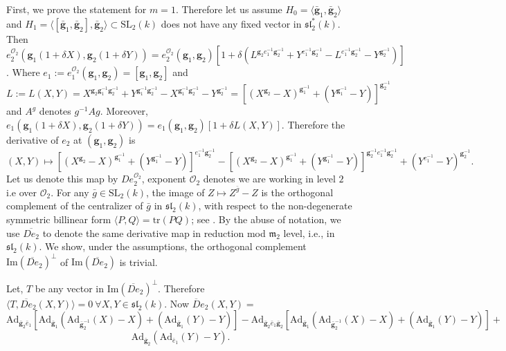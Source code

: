 \documentclass[10pt,twoside]{amsart}
\newcommand{\SL}{\mathrm{SL}}
\newcommand{\tr}{\mathrm{tr}}
\newcommand{\im}{\mathrm{Im}}
\newcommand{\R}{\mathcal{O}_2}
\theoremstyle{definition}
\theoremstyle{definition}
\begin{document}
\iffalse 
First, we prove the statement for $m=1$. 
Therefore let us assume $H_0= \langle \mathbf{\bar g}_1,\mathbf{\bar g}_2\rangle$ and $H_1 = \langle [\mathbf{\bar g}_1, \mathbf{\bar g}_2], \mathbf{\bar g}_2\rangle\subset \SL_2(k)$ does not have any fixed vector in $\mathfrak {sl}_2^*(k)$. Then $e_2^{\R}(\mathbf{g}_1(1+\delta X),\mathbf{g}_2(1+\delta Y))=e_2^{\R}(\mathbf{g}_1,\mathbf{g}_2)[1+\delta (L^{\mathbf{g}_2e_1^{-1}\mathbf{g}_2^{-1}}+Y^{e_1^{-1}\mathbf{g}_2^{-1}}-L^{e_1^{-1}\mathbf{g}_2^{-1}}-Y^{\mathbf{g}_2^{-1}})]$. Where $e_1:=e_1^{\R}(\mathbf{g}_1,\mathbf{g}_2)=[\mathbf{g}_1,\mathbf{g}_2]$ and $L:=L(X,Y)=X^{\mathbf{g}_2\mathbf{g}_1^{-1}\mathbf{g}_2^{-1}}+Y^{\mathbf{g}_1^{-1}\mathbf{g}_2^{-1}}-X^{\mathbf{g}_1^{-1}\mathbf{g}_2^{-1}}-Y^{\mathbf{g}_2^{-1}}=[(X^{\mathbf{g}_2}-X)^{\mathbf{g}_1^{-1}}+(Y^{\mathbf{g}_1^{-1}}-Y)]^{\mathbf{g}_2^{-1}}$ and $A^g$ denotes $g^{-1}Ag$. Moreover, $e_1(\mathbf{g}_1(1+\delta X),\mathbf{g}_2(1+\delta Y))=e_1(\mathbf{g}_1,\mathbf{g}_2)[1+\delta L(X,Y)]$.  Therefore the derivative of $e_2$ at $(\mathbf{g}_1,\mathbf{g}_2)$ is $$(X,Y)\mapsto [(X^{\mathbf{g}_2}-X)^{\mathbf{g}_1^{-1}}+(Y^{\mathbf{g}_1^{-1}}-Y)]^{e_1^{-1}\mathbf{g}_2^{-1}}-[(X^{\mathbf{g}_2}-X)^{\mathbf{g}_1^{-1}}+(Y^{\mathbf{g}_1^{-1}}-Y)]^{\mathbf{g}_2^{-1}e_1^{-1}\mathbf{g}_2^{-1}}+(Y^{e_1^{-1}}-Y)^{\mathbf{g}_2^{-1}}.$$ Let us denote this map by $De^{\R}_2$, exponent $\R$ denotes we are working in level $2$ i.e over $\mathcal{O}_2$. For any $\bar g\in \SL_2(k)$, the image of $Z\mapsto Z^{\bar g}-Z$ is the orthogonal complement of the centralizer of $\bar g$ in $\mathfrak{sl}_2(k)$, with respect to the non-degenerate symmetric billinear form $\langle P,Q\rangle=\tr(PQ)$; see \cite[proposition 3.1]{AvniGelanderKassabovShalev}. By the abuse of notation, we use $\overline{De_2}$ to denote the same derivative map in reduction mod $\mathfrak{m}_2$ level, i.e., in $\mathfrak{sl}_2(k)$. We show, under the assumptions, the orthogonal complement $\im(\overline{De}_2)^{\perp}$ of $\im(\overline{De}_2)$ is trivial.   

    Let, $T$ be any vector in $\im(\overline{De}_2)^{\perp}$. Therefore $\langle T, \overline{De}_2(X,Y)\rangle=0 \ \forall X,Y\in \mathfrak{sl}_2(k) $. Now $\overline{D}e_2(X,Y)=$ $$\mathrm{Ad}_{\mathbf{\bar g}_2 \bar e_1}[\mathrm{Ad}_{\mathbf{\bar g}_1}(\mathrm{Ad}_{\mathbf{\bar g}_2^{-1}}(X)-X)+(\mathrm{Ad}_{\mathbf{\bar g}_1}(Y)-Y)]-\mathrm{Ad}_{\mathbf{\bar g}_2 \bar e_1\mathbf{\bar g}_2}[\mathrm{Ad}_{\mathbf{\bar g}_1}(\mathrm{Ad}_{\mathbf{\bar g}_2^{-1}}(X)-X)+(\mathrm{Ad}_{\mathbf{\bar g}_1}(Y)-Y)] + $$ $$\mathrm{Ad}_{\mathbf{\bar g}_2}(\mathrm{Ad}_{ \bar e_1}(Y)-Y).$$ 
\end{document}
